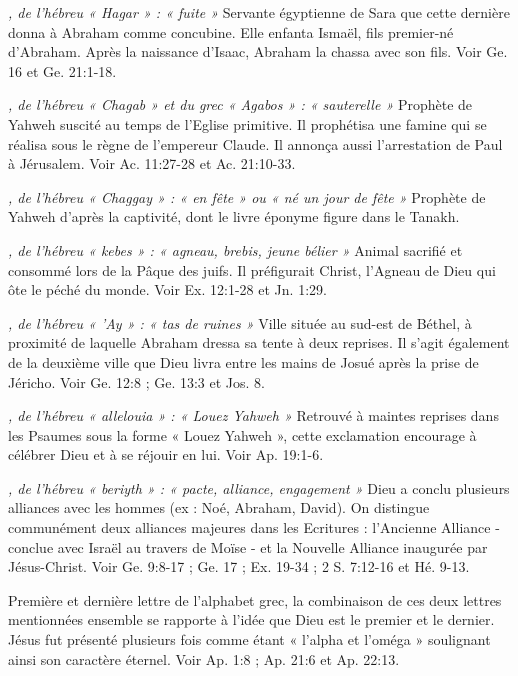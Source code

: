 \begin{multicols}{2}
\textit{, de l'hébreu « Hagar » : « fuite »}\newline
Servante égyptienne de Sara que cette dernière donna à Abraham comme concubine. Elle enfanta Ismaël, fils premier-né d'Abraham. Après la naissance d'Isaac, Abraham la chassa avec son fils. Voir Ge. 16 et Ge. 21:1-18.

\textit{, de l'hébreu « Chagab » et du grec « Agabos » : « sauterelle »}\newline
Prophète de Yahweh suscité au temps de l'Eglise primitive. Il prophétisa une famine qui se réalisa sous le règne de l'empereur Claude. Il annonça aussi l'arrestation de Paul à Jérusalem. Voir Ac. 11:27-28 et Ac. 21:10-33.

\textit{, de l'hébreu « Chaggay » : « en fête » ou « né un jour de fête »}\newline
Prophète de Yahweh d'après la captivité, dont le livre éponyme figure dans le Tanakh.

\textit{, de l'hébreu « kebes » : « agneau, brebis, jeune bélier »}\newline
Animal sacrifié et consommé lors de la Pâque des juifs. Il préfigurait Christ, l'Agneau de Dieu qui ôte le péché du monde. Voir Ex. 12:1-28 et Jn. 1:29.

\textit{, de l'hébreu « 'Ay » : « tas de ruines »}\newline
Ville située au sud-est de Béthel, à proximité de laquelle Abraham dressa sa tente à deux reprises. Il s'agit également de la deuxième ville que Dieu livra entre les mains de Josué après la prise de Jéricho. Voir Ge. 12:8 ; Ge. 13:3 et Jos. 8.

\textit{, de l'hébreu « allelouia » : « Louez Yahweh »}\newline
Retrouvé à maintes reprises dans les Psaumes sous la forme « Louez Yahweh », cette exclamation encourage à célébrer Dieu et à se réjouir en lui. Voir Ap. 19:1-6.

\textit{, de l'hébreu « beriyth » : « pacte, alliance, engagement »}\newline
Dieu a conclu plusieurs alliances avec les hommes (ex : Noé, Abraham, David). On distingue communément deux alliances majeures dans les Ecritures : l'Ancienne Alliance - conclue avec Israël au travers de Moïse - et la Nouvelle Alliance inaugurée par Jésus-Christ. Voir Ge. 9:8-17 ; Ge. 17 ; Ex. 19-34 ; 2 S. 7:12-16 et Hé. 9-13.

\textit{}\newline
Première et dernière lettre de l'alphabet grec, la combinaison de ces deux lettres mentionnées ensemble se rapporte à l'idée que Dieu est le premier et le dernier. Jésus fut présenté plusieurs fois comme étant « l'alpha et l'oméga » soulignant ainsi son caractère éternel. Voir Ap. 1:8 ; Ap. 21:6 et Ap. 22:13.


\end{multicols}
